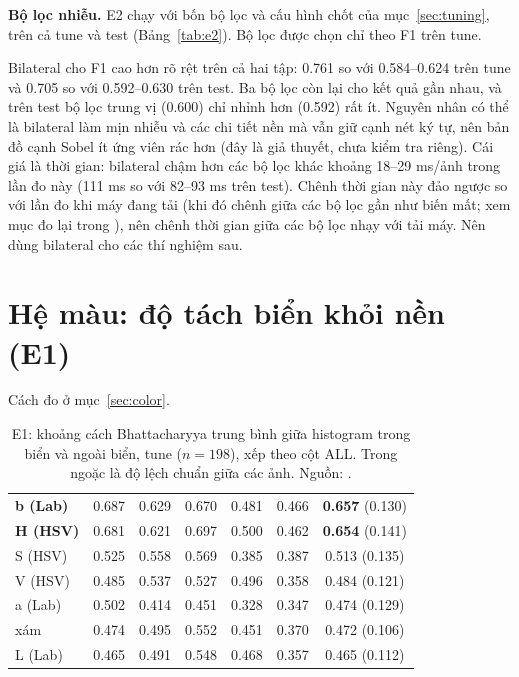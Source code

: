 \textbf{Bộ lọc nhiễu.} E2 chạy  với bốn bộ lọc và cấu hình chốt của mục~\ref{sec:tuning}, trên cả tune và test (Bảng~\ref{tab:e2}). Bộ lọc được chọn chỉ theo F1 trên tune.



Bilateral cho F1 cao hơn rõ rệt trên cả hai tập: 0.761 so với 0.584--0.624 trên tune và 0.705 so với 0.592--0.630 trên test. Ba bộ lọc còn lại cho kết quả gần nhau, và trên test bộ lọc trung vị (0.600) chỉ nhỉnh hơn  (0.592) rất ít. Nguyên nhân có thể là bilateral làm mịn nhiễu và các chi tiết nền mà vẫn giữ cạnh nét ký tự, nên bản đồ cạnh Sobel ít ứng viên rác hơn (đây là giả thuyết, chưa kiểm tra riêng). Cái giá là thời gian: bilateral chậm hơn các bộ lọc khác khoảng 18--29 ms/ảnh trong lần đo này (111 ms so với 82--93 ms trên test). Chênh thời gian này đảo ngược so với lần đo khi máy đang tải (khi đó chênh giữa các bộ lọc gần như biến mất; xem mục đo lại trong ), nên chênh thời gian giữa các bộ lọc nhạy với tải máy. Nên dùng bilateral cho các thí nghiệm sau.

\section{Hệ màu: độ tách biển khỏi nền (E1)}
\label{sec:e1}

Cách đo ở mục~\ref{sec:color}.

\begin{table}[htbp]
\centering
\caption[E1: độ tách biển / nền theo kênh màu (tune)]{E1: khoảng cách Bhattacharyya trung bình giữa histogram trong biển và ngoài biển, tune ($n=198$), xếp theo cột ALL. Trong ngoặc là độ lệch chuẩn giữa các ảnh. Nguồn: .}
\label{tab:e1}
\small
{}
\begin{tabularx}{\textwidth}{lCCCCCC}
\hline
{}  &  &  &  &  &  &  \\
\hline
\textbf{b (Lab)} & 0.687 & 0.629 & 0.670 & 0.481 & 0.466 & \textbf{0.657} (0.130) \\
\textbf{H (HSV)} & 0.681 & 0.621 & 0.697 & 0.500 & 0.462 & \textbf{0.654} (0.141) \\
S (HSV) & 0.525 & 0.558 & 0.569 & 0.385 & 0.387 & 0.513 (0.135) \\
V (HSV) & 0.485 & 0.537 & 0.527 & 0.496 & 0.358 & 0.484 (0.121) \\
a (Lab) & 0.502 & 0.414 & 0.451 & 0.328 & 0.347 & 0.474 (0.129) \\
xám & 0.474 & 0.495 & 0.552 & 0.451 & 0.370 & 0.472 (0.106) \\
L (Lab) & 0.465 & 0.491 & 0.548 & 0.468 & 0.357 & 0.465 (0.112) \\
\hline
\end{tabularx}
\end{table}


